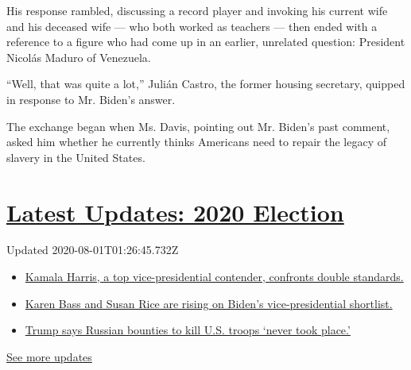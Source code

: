 His response rambled, discussing a record player and invoking his
current wife and his deceased wife --- who both worked as teachers ---
then ended with a reference to a figure who had come up in an earlier,
unrelated question: President Nicolás Maduro of Venezuela.

``Well, that was quite a lot,'' Julián Castro, the former housing
secretary, quipped in response to Mr. Biden's answer.

The exchange began when Ms. Davis, pointing out Mr. Biden's past
comment, asked him whether he currently thinks Americans need to repair
the legacy of slavery in the United States.

\hypertarget{latest-updates-2020-election}{%
\section{\texorpdfstring{\href{https://www.nytimes.com/2020/07/31/us/elections/biden-vs-trump.html?action=click\&pgtype=Article\&state=default\&region=MAIN_CONTENT_1\&context=storylines_live_updates}{Latest
Updates: 2020
Election}}{Latest Updates: 2020 Election}}\label{latest-updates-2020-election}}

Updated 2020-08-01T01:26:45.732Z

\begin{itemize}
\tightlist
\item
  \href{https://www.nytimes.com/2020/07/31/us/elections/biden-vs-trump.html?action=click\&pgtype=Article\&state=default\&region=MAIN_CONTENT_1\&context=storylines_live_updates\#link-29fdff45}{Kamala
  Harris, a top vice-presidential contender, confronts double
  standards.}
\item
  \href{https://www.nytimes.com/2020/07/31/us/elections/biden-vs-trump.html?action=click\&pgtype=Article\&state=default\&region=MAIN_CONTENT_1\&context=storylines_live_updates\#link-13ec3d9c}{Karen
  Bass and Susan Rice are rising on Biden's vice-presidential
  shortlist.}
\item
  \href{https://www.nytimes.com/2020/07/31/us/elections/biden-vs-trump.html?action=click\&pgtype=Article\&state=default\&region=MAIN_CONTENT_1\&context=storylines_live_updates\#link-49e9a016}{Trump
  says Russian bounties to kill U.S. troops `never took place.'}
\end{itemize}

\href{https://www.nytimes.com/2020/07/31/us/elections/biden-vs-trump.html?action=click\&pgtype=Article\&state=default\&region=MAIN_CONTENT_1\&context=storylines_live_updates}{See
more updates}

